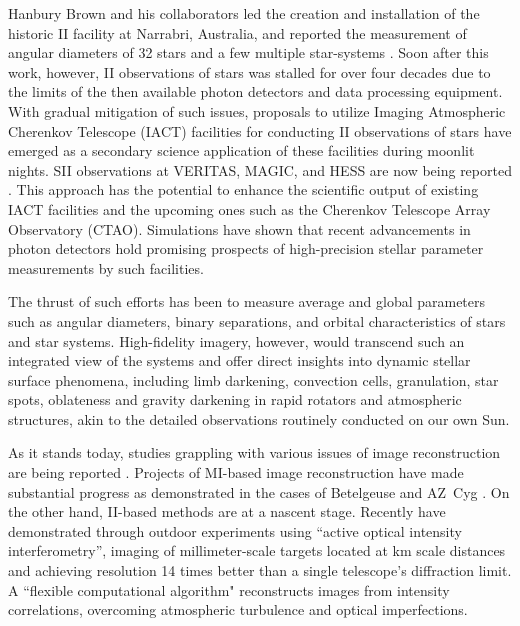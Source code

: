 Hanbury Brown and his collaborators led the creation and installation of the historic II facility at Narrabri, Australia, and reported the measurement of angular diameters of 32 stars and a few multiple star-systems \citep{hanbury1974angular}. Soon after this work, however, II observations of stars was stalled for over four decades due to the limits of the then available photon detectors and data processing equipment. With gradual mitigation of such issues, proposals to utilize Imaging Atmospheric Cherenkov Telescope (IACT) facilities for conducting II observations of stars have emerged \citep{LeBohec2006, nunez2010stellar, nunez2012high, 2013APh....43..331D} as a secondary science application of these facilities during moonlit nights. SII observations at VERITAS, MAGIC, and HESS are now being reported \citep[e.g.,][]{2024ApJ...966...28A,2024MNRAS.529.4387A,2025MNRAS.537.2334V}. This approach has the potential to enhance the scientific output of existing IACT facilities and the upcoming ones such as the Cherenkov Telescope Array Observatory (CTAO). Simulations \citep[e.g.,][]{10.1093/mnras/stab2391, 10.1093/mnras/stac2433} have shown that recent advancements in photon detectors hold promising prospects of high-precision stellar parameter measurements by such facilities.

The thrust of such efforts has been to measure average and global parameters  such as angular diameters, binary separations, and orbital characteristics of stars and star systems. High-fidelity imagery, however, would transcend such an integrated view of the systems and offer direct insights into dynamic stellar surface phenomena, including limb darkening, convection cells, granulation, star spots, oblateness and gravity darkening in rapid rotators and atmospheric structures, akin to the detailed observations routinely conducted on our own Sun.

As it stands today, studies grappling with various issues of image reconstruction are being reported \citep{Haubois2009, Norris2021AZCyg, Liu2024SuperresolutionII, Liu2025}. Projects of MI-based image reconstruction have made substantial progress as demonstrated in the cases of Betelgeuse \citep{Haubois2009} and AZ~Cyg \citep{Norris2021AZCyg}. On the other hand, II-based methods are at a nascent stage. Recently \cite{Liu2024SuperresolutionII, Liu2025} have demonstrated through outdoor experiments using ``active optical intensity interferometry'', imaging of millimeter-scale targets located at km scale distances and achieving resolution 14 times better than a single telescope’s diffraction limit. A ``flexible computational algorithm" reconstructs images from intensity correlations, overcoming atmospheric turbulence and optical imperfections.

